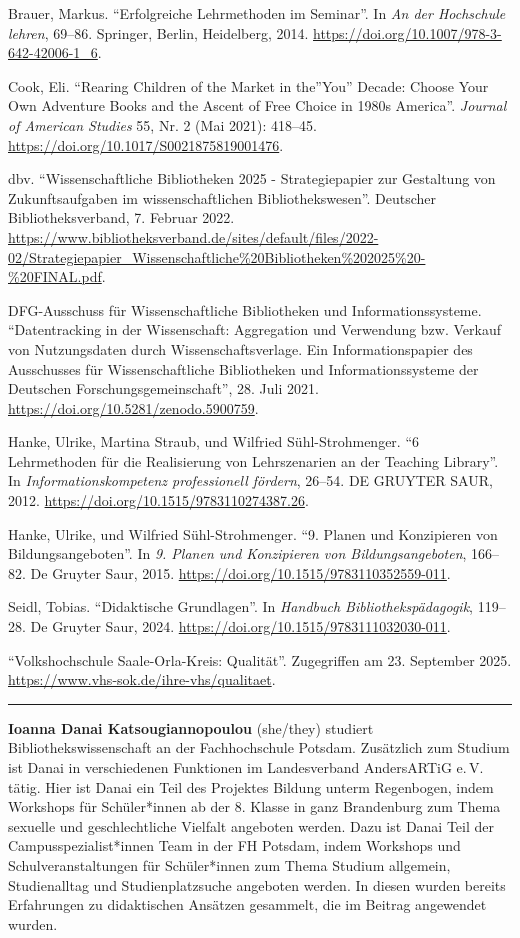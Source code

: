 \documentclass[a4paper,
fontsize=11pt,
oneside,
numbers=noperiodatend,
parskip=half-,
bibliography=totoc,
final
]{scrartcl}
\begin{document}
Brauer, Markus. \enquote{Erfolgreiche Lehrmethoden im Seminar}. In
\emph{An der Hochschule lehren}, 69--86. Springer, Berlin, Heidelberg,
2014. \url{https://doi.org/10.1007/978-3-642-42006-1_6}.

Cook, Eli. \enquote{Rearing Children of the Market in the}You'' Decade:
Choose Your Own Adventure Books and the Ascent of Free Choice in 1980s
America''. \emph{Journal of American Studies} 55, Nr. 2 (Mai 2021):
418--45. \url{https://doi.org/10.1017/S0021875819001476}.

dbv. \enquote{Wissenschaftliche Bibliotheken 2025 - Strategiepapier zur
Gestaltung von Zukunftsaufgaben im wissenschaftlichen Bibliothekswesen}.
Deutscher Bibliotheksverband, 7. Februar 2022.
\url{https://www.bibliotheksverband.de/sites/default/files/2022-02/Strategiepapier_Wissenschaftliche\%20Bibliotheken\%202025\%20-\%20FINAL.pdf}.

DFG-Ausschuss für Wissenschaftliche Bibliotheken und
Informationssysteme. \enquote{Datentracking in der Wissenschaft:
Aggregation und Verwendung bzw. Verkauf von Nutzungsdaten durch
Wissenschaftsverlage. Ein Informationspapier des Ausschusses für
Wissenschaftliche Bibliotheken und Informationssysteme der Deutschen
Forschungsgemeinschaft}, 28. Juli 2021.
\url{https://doi.org/10.5281/zenodo.5900759}.

Hanke, Ulrike, Martina Straub, und Wilfried Sühl-Strohmenger. \enquote{6
Lehrmethoden für die Realisierung von Lehrszenarien an der Teaching
Library}. In \emph{Informationskompetenz professionell fördern}, 26--54.
DE GRUYTER SAUR, 2012. \url{https://doi.org/10.1515/9783110274387.26}.

Hanke, Ulrike, und Wilfried Sühl-Strohmenger. \enquote{9. Planen und
Konzipieren von Bildungsangeboten}. In \emph{9. Planen und Konzipieren
von Bildungsangeboten}, 166--82. De Gruyter Saur, 2015.
\url{https://doi.org/10.1515/9783110352559-011}.

Seidl, Tobias. \enquote{Didaktische Grundlagen}. In \emph{Handbuch
Bibliothekspädagogik}, 119--28. De Gruyter Saur, 2024.
\url{https://doi.org/10.1515/9783111032030-011}.

\enquote{Volkshochschule Saale-Orla-Kreis: Qualität}. Zugegriffen am 23.
September 2025. \url{https://www.vhs-sok.de/ihre-vhs/qualitaet}.

\begin{center}\rule{0.5\linewidth}{0.5pt}\end{center}

\textbf{Ioanna Danai Katsougiannopoulou} (she/they) studiert
Bibliothekswissenschaft an der Fachhochschule Potsdam. Zusätzlich zum
Studium ist Danai in verschiedenen Funktionen im Landesverband
AndersARTiG e.\,V. tätig. Hier ist Danai ein Teil des Projektes Bildung
unterm Regenbogen, indem Workshops für Schüler*innen ab der 8.
Klasse in ganz Brandenburg zum Thema sexuelle und geschlechtliche
Vielfalt angeboten werden. Dazu ist Danai Teil der
Campusspezialist*innen Team in der FH Potsdam, indem Workshops und
Schulveranstaltungen für Schüler*innen zum Thema Studium allgemein,
Studienalltag und Studienplatzsuche angeboten werden. In diesen wurden
bereits Erfahrungen zu didaktischen Ansätzen gesammelt, die im Beitrag
angewendet wurden.
\end{document}
